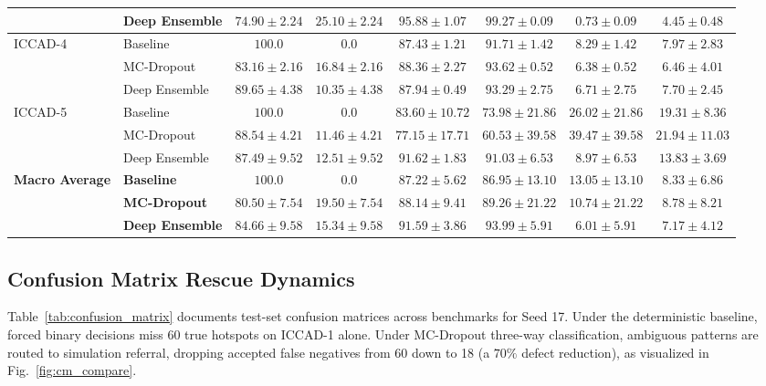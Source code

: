 \documentclass[conference]{IEEEtran}
\begin{document}
\begin{table}[htbp]
{\begin{tabular}{llcccccc}
& Deep Ensemble & $74.90 \pm 2.24$ & $25.10 \pm 2.24$ & $95.88 \pm 1.07$ & $99.27 \pm 0.09$ & $0.73 \pm 0.09$ & $4.45 \pm 0.48$ \\
\midrule
\multirow{3}{*}{ICCAD-4} 
& Baseline & $100.0$ & $0.0$ & $87.43 \pm 1.21$ & $91.71 \pm 1.42$ & $8.29 \pm 1.42$ & $7.97 \pm 2.83$ \\
& MC-Dropout & $83.16 \pm 2.16$ & $16.84 \pm 2.16$ & $88.36 \pm 2.27$ & $93.62 \pm 0.52$ & $6.38 \pm 0.52$ & $6.46 \pm 4.01$ \\
& Deep Ensemble & $89.65 \pm 4.38$ & $10.35 \pm 4.38$ & $87.94 \pm 0.49$ & $93.29 \pm 2.75$ & $6.71 \pm 2.75$ & $7.70 \pm 2.45$ \\
\midrule
\multirow{3}{*}{ICCAD-5} 
& Baseline & $100.0$ & $0.0$ & $83.60 \pm 10.72$ & $73.98 \pm 21.86$ & $26.02 \pm 21.86$ & $19.31 \pm 8.36$ \\
& MC-Dropout & $88.54 \pm 4.21$ & $11.46 \pm 4.21$ & $77.15 \pm 17.71$ & $60.53 \pm 39.58$ & $39.47 \pm 39.58$ & $21.94 \pm 11.03$ \\
& Deep Ensemble & $87.49 \pm 9.52$ & $12.51 \pm 9.52$ & $91.62 \pm 1.83$ & $91.03 \pm 6.53$ & $8.97 \pm 6.53$ & $13.83 \pm 3.69$ \\
\midrule
\textbf{Macro Average} 
& \textbf{Baseline} & $\mathbf{100.0}$ & $\mathbf{0.0}$ & $\mathbf{87.22 \pm 5.62}$ & $\mathbf{86.95 \pm 13.10}$ & $\mathbf{13.05 \pm 13.10}$ & $\mathbf{8.33 \pm 6.86}$ \\
& \textbf{MC-Dropout} & $\mathbf{80.50 \pm 7.54}$ & $\mathbf{19.50 \pm 7.54}$ & $\mathbf{88.14 \pm 9.41}$ & $\mathbf{89.26 \pm 21.22}$ & $\mathbf{10.74 \pm 21.22}$ & $\mathbf{8.78 \pm 8.21}$ \\
& \textbf{Deep Ensemble} & $\mathbf{84.66 \pm 9.58}$ & $\mathbf{15.34 \pm 9.58}$ & $\mathbf{91.59 \pm 3.86}$ & $\mathbf{93.99 \pm 5.91}$ & $\mathbf{6.01 \pm 5.91}$ & $\mathbf{7.17 \pm 4.12}$ \\
\bottomrule
\end{tabular}
}
\end{table}

\subsection{Confusion Matrix Rescue Dynamics}
Table~\ref{tab:confusion_matrix} documents test-set confusion matrices across benchmarks for Seed 17. Under the deterministic baseline, forced binary decisions miss 60 true hotspots on ICCAD-1 alone. Under MC-Dropout three-way classification, ambiguous patterns are routed to simulation referral, dropping accepted false negatives from 60 down to 18 (a $70\%$ defect reduction), as visualized in Fig.~\ref{fig:cm_compare}.
\end{document}
